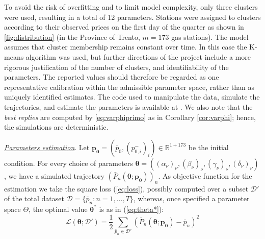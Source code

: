 \documentclass[graybox]{svmult}
\begin{document}



To avoid the risk of overfitting and to 
limit model complexity, only three clusters were used, resulting in a total of 12 parameters. Stations were assigned to clusters according to their observed prices on the first day of the quarter as shown in \ref{fig:distribution} (in the Province of Trento, $m=173$ gas stations). The model assumes that cluster membership remains constant over time. In this case the K-means algorithm was used, but further directions of the project include a more rigorous justification of the number of clusters, %
and identifiability of the parameters. The reported values should therefore be regarded as one representative calibration within the admissible parameter space, rather than as uniquely identified estimates. The code used to manipulate the data, simulate the trajectories, and estimate the parameters is available at \cite{fedP}. We also note that the
 \emph{best replies} are computed  by \eqref{eq:varphiprimo} as in Corollary \ref{cor:varphi}; hence, the simulations are deterministic. 

{\it \underline{Parameters estimation}}.
 Let $\boldsymbol{p_0}=(\bar{p}_{0},(p_{0,i}^-)_i)\in \mathbb{R}^{1+173}$ be the initial condition. For every choice of parameters $\boldsymbol{\theta}=((\alpha_{\nu})_\nu, (\beta_\nu)_\nu,(\gamma_\nu)_\nu,(\delta_\nu)_\nu)$, we have a simulated trajectory $\left(\bar{P}_{n}(\boldsymbol{\theta};\boldsymbol{p_0}) \right)_n$. As objective function for the estimation we take the square loss (\ref{eq:loss}), possibly computed over a subset $\mathcal{D'}$ of the total dataset $\mathcal{D} =\{\bar{p}_n: n=1,..., T\}$, whereas, once specified a parameter space $\Theta$, the optimal value $\boldsymbol{\theta^*}$ is as in (\ref{eq:theta*}): 
 \begin{equation}
 \label{eq:loss}
     \mathcal{L}(\boldsymbol{\theta};\mathcal{D}')=\frac{1}{2}\sum_{\bar{p}_n \in \mathcal{D'}}(\bar{P}_n(\boldsymbol{\theta}; \boldsymbol{p_0})-\bar{p}_n)^2
 \end{equation}
\end{document}
